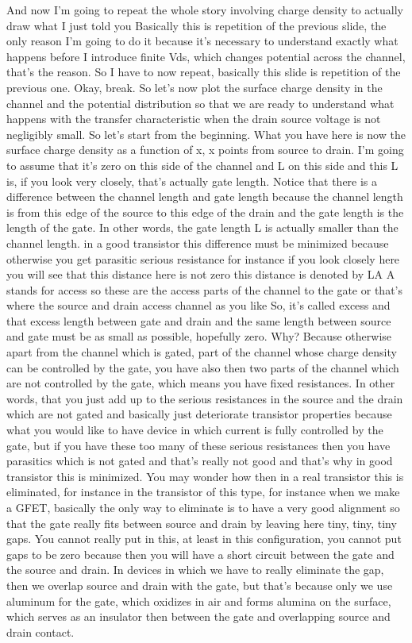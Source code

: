 And now I'm going to repeat the whole story involving charge density to actually draw what I just told you Basically this is repetition of the previous slide, the only reason I'm going to do it because it's necessary to understand exactly what happens before I introduce finite Vds, which changes potential across the channel, that's the reason. So I have to now repeat, basically this slide is repetition of the previous one. Okay, break. So let's now plot the surface charge density in the channel and the potential distribution so that we are ready to understand what happens with the transfer characteristic when the drain source voltage is not negligibly small. So let's start from the beginning. What you have here is now the surface charge density as a function of x, x points from source to drain. I'm going to assume that it's zero on this side of the channel and L on this side and this L is, if you look very closely, that's actually gate length. Notice that there is a difference between the channel length and gate length because the channel length is from this edge of the source to this edge of the drain and the gate length is the length of the gate. In other words, the gate length L is actually smaller than the channel length. in a good transistor this difference must be minimized because otherwise you get parasitic serious resistance for instance if you look closely here you will see that this distance here is not zero this distance is denoted by LA A stands for access so these are the access parts of the channel to the gate or that's where the source and drain access channel as you like So, it's called excess and that excess length between gate and drain and the same length between source and gate must be as small as possible, hopefully zero. Why? Because otherwise apart from the channel which is gated, part of the channel whose charge density can be controlled by the gate, you have also then two parts of the channel which are not controlled by the gate, which means you have fixed resistances. In other words, that you just add up to the serious resistances in the source and the drain which are not gated and basically just deteriorate transistor properties because what you would like to have device in which current is fully controlled by the gate, but if you have these too many of these serious resistances then you have parasitics which is not gated and that's really not good and that's why in good transistor this is minimized. You may wonder how then in a real transistor this is eliminated, for instance in the transistor of this type, for instance when we make a GFET, basically the only way to eliminate is to have a very good alignment so that the gate really fits between source and drain by leaving here tiny, tiny, tiny gaps. You cannot really put in this, at least in this configuration, you cannot put gaps to be zero because then you will have a short circuit between the gate and the source and drain. In devices in which we have to really eliminate the gap, then we overlap source and drain with the gate, but that's because only we use aluminum for the gate, which oxidizes in air and forms alumina on the surface, which serves as an insulator then between the gate and overlapping source and drain contact. 